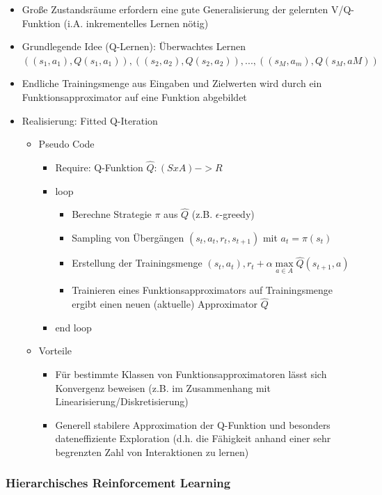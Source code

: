 \documentclass[paper=a4, fontsize=11pt]{scrartcl} %
\numberwithin{equation}{section} %
\numberwithin{figure}{section} %
\numberwithin{table}{section} %
\begin{document}
\begin{itemize}
\item Große Zustandsräume erfordern eine gute Generalisierung der gelernten V/Q-Funktion (i.A. inkrementelles Lernen nötig)
\item Grundlegende Idee (Q-Lernen): Überwachtes Lernen\\ ${((s_1,a_1),Q(s_1,a_1)),((s_2,a_2),Q(s_2,a_2)),...,((s_M,a_m),Q(s_M,aM))}$
\item Endliche Trainingsmenge aus Eingaben und Zielwerten wird durch ein Funktionsapproximator auf eine Funktion abgebildet
\item Realisierung: Fitted Q-Iteration
\begin{itemize}
\item Pseudo Code
\begin{itemize}
\item Require: Q-Funktion $\hat{Q}:(SxA) -> R$
\item loop
\begin{itemize}
\item Berechne Strategie $\pi$ aus $\hat{Q}$ (z.B. $\epsilon$-greedy)
\item Sampling von Übergängen $(s_t,a_t,r_t,s_{t+1})$ mit $a_t = \pi(s_t)$
\item Erstellung der Trainingsmenge ${(s_t,a_t),r_t+\alpha \max\limits_{a \in A} \hat{Q}(s_{t+1},a)}$
\item Trainieren eines Funktionsapproximators auf Trainingsmenge ergibt einen neuen (aktuelle) Approximator $\hat{Q}$
\end{itemize}
\item end loop
\end{itemize}
\item Vorteile
\begin{itemize}
\item Für bestimmte Klassen von Funktionsapproximatoren lässt sich Konvergenz beweisen (z.B. im Zusammenhang mit Linearisierung/Diskretisierung)
\item Generell stabilere Approximation der Q-Funktion und besonders dateneffiziente Exploration (d.h. die Fähigkeit anhand einer sehr begrenzten Zahl von Interaktionen zu lernen)
\end{itemize}
\end{itemize}
\end{itemize}

\subsubsection{Hierarchisches Reinforcement Learning}
\end{document}
